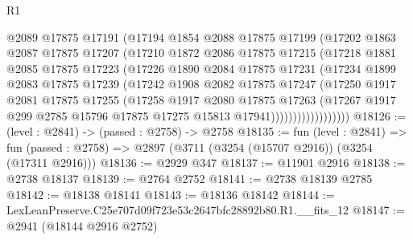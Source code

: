 \begin{lexlean}{R1}
\begin{coremodule}
                    @2089
                    @17875
                    @17191
                    (@17194
                      @1854
                      @2088
                      @17875
                      @17199
                      (@17202
                        @1863
                        @2087
                        @17875
                        @17207
                        (@17210
                          @1872
                          @2086
                          @17875
                          @17215
                          (@17218
                            @1881
                            @2085
                            @17875
                            @17223
                            (@17226
                              @1890
                              @2084
                              @17875
                              @17231
                              (@17234
                                @1899
                                @2083
                                @17875
                                @17239
                                (@17242
                                  @1908
                                  @2082
                                  @17875
                                  @17247
                                  (@17250
                                    @1917
                                    @2081
                                    @17875
                                    @17255
                                    (@17258
                                      @1917
                                      @2080
                                      @17875
                                      @17263
                                      (@17267
                                        @1917
                                        @299
                                        @2785
                                        @15796
                                        @17875
                                        @17275
                                        @15813
                                        @17941))))))))))))))))))
@18126 := (level : @2841) -> (passed : @2758) -> @2758
@18135 := fun (level : @2841) =>
  fun (passed : @2758) => @2897 (@3711 (@3254 (@15707 @2916)) (@3254 (@17311 @2916)))
@18136 := @2929 @347
@18137 := @11901 @2916
@18138 := @2738 @18137
@18139 := @2764 @2752
@18141 := @2738 @18139 @2785
@18142 := @18138 @18141
@18143 := @18136 @18142
@18144 := LexLeanPreserve.C25e707d09f723e53c2647bfc28892b80.R1.__fits_12
@18147 := @2941 (@18144 @2916 @2752)

\end{coremodule}
\end{lexlean}
